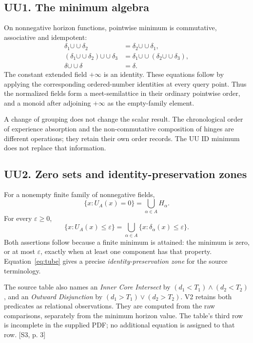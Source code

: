 \documentclass[11pt,a4paper]{article}
\numberwithin{equation}{section}
\newcommand{\src}[2]{{\sffamily\small\color{slate}[#1, #2]}}
\newcommand{\dcup}{\mathbin{\cup\!\cup}}
\begin{document}
\subsection{UU1. The minimum algebra}
On nonnegative horizon functions, pointwise minimum is commutative, associative and idempotent:
\begin{align}
\delta_1\dcup\delta_2&=\delta_2\dcup\delta_1,\\
(\delta_1\dcup\delta_2)\dcup\delta_3
&=\delta_1\dcup(\delta_2\dcup\delta_3),\\
\delta\dcup\delta&=\delta.
\end{align}
The constant extended field $+\infty$ is an identity. These equations follow by applying the corresponding ordered-number identities at every query point. Thus the normalized fields form a meet-semilattice in their ordinary pointwise order, and a monoid after adjoining $+\infty$ as the empty-family element.

A change of grouping does not change the scalar result. The chronological order of experience absorption and the non-commutative composition of hinges are different operations; they retain their own order records. The UU ID minimum does not replace that information.

\subsection{UU2. Zero sets and identity-preservation zones}
For a nonempty finite family of nonnegative fields,
\begin{equation}
\{x:U_A(x)=0\}=\bigcup_{\alpha\in A}H_\alpha.
\label{eq:zeroset}
\end{equation}
For every $\varepsilon\ge0$,
\begin{equation}
\{x:U_A(x)\le\varepsilon\}
=\bigcup_{\alpha\in A}\{x:\delta_\alpha(x)\le\varepsilon\}.
\label{eq:tube}
\end{equation}
Both assertions follow because a finite minimum is attained: the minimum is zero, or at most $\varepsilon$, exactly when at least one component has that property. Equation~\eqref{eq:tube} gives a precise \emph{identity-preservation zone} for the source terminology.

The source table also names an \emph{Inner Core Intersect} by $(d_1<T_1)\land(d_2<T_2)$, and an \emph{Outward Disjunction} by $(d_1>T_1)\lor(d_2>T_2)$. V2 retains both predicates as relational observations. They are computed from the raw comparisons, separately from the minimum horizon value. The table's third row is incomplete in the supplied PDF; no additional equation is assigned to that row. \src{S3}{p. 3}
\end{document}
